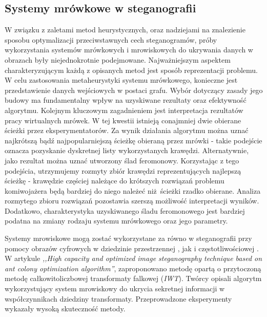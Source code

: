 {{        \subsection{Systemy mrówkowe w steganografii}
        {
            W związku z zaletami metod heurystycznych, oraz nadziejami na znalezienie sposobu optymalizacji
            przeciwstawnych cech steganogramów, próby wykorzystania systemów mrówkowych i mrowiskowych do ukrywania
            danych w obrazach były niejednokrotnie podejmowane\cite{Priya2018HIGHCA, ZghaerACOStegEN, Khan2018AntCO}.
            Najważniejszym aspektem charakteryzującym każdą z opisanych metod jest sposób reprezentacji problemu. W celu
            zastosowania metaheurystyki systemu mrówkowego, konieczne jest przedstawienie danych wejściowych w postaci
            grafu. Wybór dotyczący zasady jego budowy ma fundamentalny wpływ na uzyskiwane rezultaty oraz efektywność
            algorytmu. Kolejnym kluczowym zagadnieniem jest interpretacja rezultatów pracy wirtualnych mrówek. W tej
            kwestii istnieją conajmniej dwie obierane ścieżki przez eksperymentatorów. Za wynik działania algorytmu
            można uznać najkrótszą bądź najpopularniejszą ścieżkę obieraną przez mrówki - takie podejście oznacza
            pozyskanie dyskretnej listy wykorzystanych krawędzi. Alternatywnie, jako rezultat można uznać utworzony ślad
            feromonowy. Korzystając z tego podejścia, utrzymujemy rozmyty zbiór krawędzi reprezentujących najlepszą
            ścieżkę - krawędzie częściej należące do krótszych rozwiązań problemu komiwojażera będą bardziej do niego
            należeć niż ścieżki rzadko obierane. Analiza rozmytego zbioru rozwiązań pozostawia szerszą możliwość
            interpretacji wyników. Dodatkowo, charakterystyka uzyskiwanego śladu feromonowego jest bardziej podatna na
            zmiany rodzaju systemu mrówkowego oraz jego parametry.

            Systemy mrowiskowe mogą zostać wykorzystane za równo w steganografii przy pomocy obrazów cyfrowych w
            dziedzinie przestrzennej \cite{ZghaerACOStegEN, Khan2018AntCO}, jak i częstotliwościowej
            \cite{Priya2018HIGHCA}. W artykule \textit{,,High capacity and optimized image steganography technique based
            on ant colony optimization algorithm''}, zaproponowano metodę opartą o przytoczoną metodę całkowitoliczbowej
            transformaty falkowej (\textit{IWT}). Twórcy opisali algorytm wykorzystujący system mrowiskowy do ukrycia
            sekretnej informacji w współczynnikach dziedziny transformaty. Przeprowadzone eksperymenty wykazały wysoką
            skuteczność metody\cite{Priya2018HIGHCA}.

}}}
